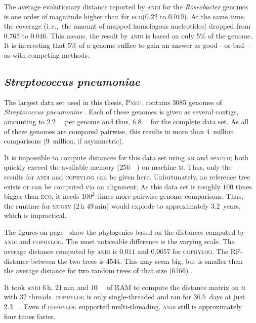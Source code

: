 \documentclass[a4paper,
  10pt,
  english,
  DIV=12,
  BCOR=8mm]{scrbook}
\newcommand{\thymine}{\textsc{m}\oldstylenums{2}\xspace}
\newcommand{\algo}[1]{\textsc{{#1}}}
\newcommand{\andi}{\algo{andi} }
\newcommand{\eco}{\textsc{eco}\oldstylenums{29}\xspace}
\newcommand{\pneu}{\textsc{Pneu}\oldstylenums{3085}\xspace}
\begin{document}
The average evolutionary distance reported by \andi for the \emph{Roseobacter} genomes is one order of magnitude higher than for \eco ($0.22$ to $0.019$). At the same time, the coverage (i.\,e.,\ the amount of mapped homologous nucleotides) dropped from $0.765$ to $0.046$. This means, the result by \andi is based on only 5\% of the genome. It is interesting that 5\% of a genome suffice to gain an answer as good---or bad---as with competing methods.


\subsection*{\textit{Streptococcus pneumoniae}} \label{sec:pneu}

The largest data set used in this thesis, \pneu, contains 3085 genomes of \emph{Streptococcus pneumoniae} \cite{d3085}. Each of these genomes is given as several contigs, amounting to \SI{2.2}{\mega\basepairs} per genome and thus, \SI{6.8}{\giga\byte} for the complete data set. As all of these genomes are compared pairwise, this results in more than 4~million comparisons (9~million, if asymmetric).

It is impossible to compute distances for this data set using \algo{kr} and \algo{spaced}; both quickly exceed the available memory (\SI{256}{\giga\byte}) on machine \thymine. Thus, only the results for \andi and \algo{cophylog} can be given here. Unfortunately, no reference tree exists or can be computed via an alignment; As this data set is roughly $100$ times bigger than \eco, it needs $100^2$ times more pairwise genome comparisons. Thus, the runtime for \algo{mugsy} ($2$\,h $49$\,min) would explode to approximately $3.2$~years, which is impractical.

The figures on page~\pageref{fig:test} show the phylogenies based on the distances computed by \andi and \algo{cophylog}. The most noticeable difference is the varying scale. The average distance computed by \andi is $0.011$ and $0.0057$ for \algo{cophylog}. The RF-distance between the two trees is 4544. This may seem big, but is smaller than the average distance for two random trees of that size (6166) \cite{andi}.

It took \andi $6$\,h, $21$\,min and \SI{10}{\giga\byte} of \ac{RAM} to compute the distance matrix on \thymine with 32 threads. \algo{cophylog} is only single-threaded and ran for $36.5$~days at just \SI{2.3}{\giga\byte}. Even if \algo{cophylog} supported multi-threading, \andi still is approximately four times faster. 
\end{document}
